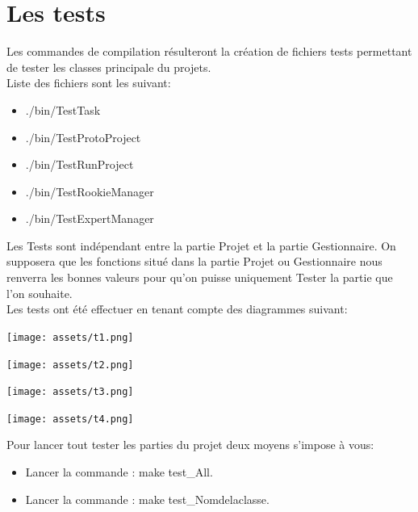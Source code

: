 \documentclass[paper=a4, fontsize=11pt, frenchb, englishb]{article}
\begin{document}
	\section{Les tests}
	
Les commandes de compilation résulteront la création de fichiers tests permettant de tester les classes principale du projets.\\

\noindent Liste des fichiers sont les suivant:

\begin{itemize}
	\item ./bin/TestTask
	\item ./bin/TestProtoProject
	\item ./bin/TestRunProject
	\item ./bin/TestRookieManager
	\item ./bin/TestExpertManager
\end{itemize}

Les Tests sont indépendant entre la partie Projet et la partie Gestionnaire. On supposera que les fonctions situé dans la partie Projet ou Gestionnaire nous renverra les bonnes valeurs pour qu'on puisse uniquement Tester la partie que l'on souhaite.\\

\noindent Les tests ont été effectuer en tenant compte des diagrammes suivant:

\begin{center}
	\texttt{[image: assets/t1.png]}
	\label{t1}
\end{center}

\begin{center}
	\texttt{[image: assets/t2.png]}
	\label{t2}
\end{center}

\begin{center}
	\texttt{[image: assets/t3.png]}
	\label{t3}
\end{center}

\begin{center}
	\texttt{[image: assets/t4.png]}
	\label{t4}
\end{center}

\noindent Pour lancer tout tester les parties du projet deux moyens s'impose à vous:

\begin{itemize}
	\item Lancer la commande : make test\_All. 
	\item Lancer la commande : make test\_Nomdelaclasse.
\end{itemize}
	
\end{document}
